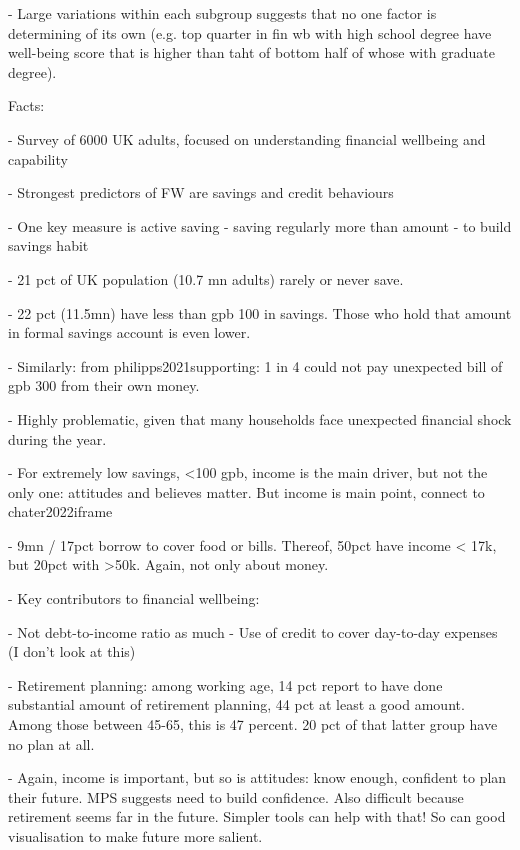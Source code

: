 - Large variations within each subgroup suggests that no one factor is
determining of its own (e.g. top quarter in fin wb with high school degree have
well-being score that is higher than taht of bottom half of whose with graduate
degree).







Facts:

\citet{mps2018building}
- Survey of 6000 UK adults, focused on understanding financial wellbeing and
capability

- Strongest predictors of FW are savings and credit behaviours

- One key measure is active saving - saving regularly more than amount - to
build savings habit

- 21 pct of UK population (10.7 mn adults) rarely or never save.

- 22 pct (11.5mn) have less than gpb 100 in savings. Those who hold that amount
in formal savings account is even lower.

- Similarly: from philipps2021supporting: 1 in 4 could not pay unexpected bill
of gpb 300 from their own money.

- Highly problematic, given that many households face unexpected financial
shock during the year.

- For extremely low savings, <100 gpb, income is the main driver, but not the
only one: attitudes and believes matter. But income is main point, connect to
chater2022iframe

- 9mn / 17pct borrow to cover food or bills. Thereof, 50pct have income < 17k,
but 20pct with >50k. Again, not only about money.

- Key contributors to financial wellbeing:

    - Not debt-to-income ratio as much
    - Use of credit to cover day-to-day expenses (I don't look at this)

- Retirement planning: among working age, 14 pct report to have done
substantial amount of retirement planning, 44 pct at least a good amount. Among
those between 45-65, this is 47 percent. 20 pct of that latter group have no
plan at all. 

- Again, income is important, but so is attitudes: know enough, confident to
plan their future. MPS suggests need to build confidence. Also difficult
because retirement seems far in the future.  Simpler tools can
help with that! So can good visualisation to make future more salient. 




